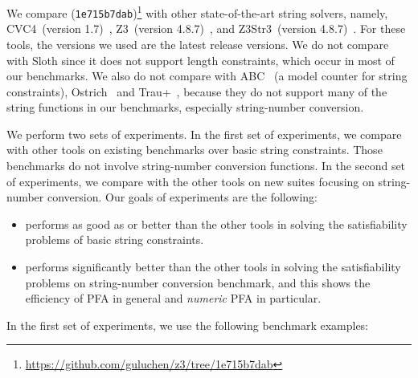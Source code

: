 We compare {\tool} (\texttt{1e715b7dab})\footnote{\url{https://github.com/guluchen/z3/tree/1e715b7dab}} with other state-of-the-art string solvers, namely, CVC4~(version 1.7)~\cite{cvc4Tool}, Z3~(version 4.8.7)~\cite{z3}, and \textsf{Z3Str3}~(version 4.8.7)~\cite{zheng2013z3}. For these tools, the versions we used are the latest release versions. 
We do not compare with Sloth \cite{sloth} since it does not support length constraints, which occur in most of our benchmarks. We also do not compare with ABC~\cite{aydin2018parameterized} (a model counter for string constraints), Ostrich~\cite{chen2019decision} and \textsf{Trau+}~\cite{abdulla2019chain}, because they do not support many of the string functions in our benchmarks, especially string-number conversion.

We perform two sets of experiments. In the first set of experiments, we compare {\tool} with other tools on existing benchmarks over basic string constraints. Those benchmarks do not involve string-number conversion functions. In the second set of experiments, we compare {\tool} with the other tools on new suites focusing on string-number conversion. Our goals of experiments are the following:
\smallskip


\begin{itemize}
	\item {\tool} performs as good as or better than the other tools in solving the  satisfiability problems of basic string constraints.
	
		\smallskip

	\item {\tool} performs significantly better than the other tools in solving the satisfiability problems on string-number conversion benchmark, and this shows  the efficiency of PFA in general and \emph{numeric} PFA in particular.
\end{itemize}
		\smallskip

In the first set of experiments, we use the following benchmark examples:

		\smallskip


